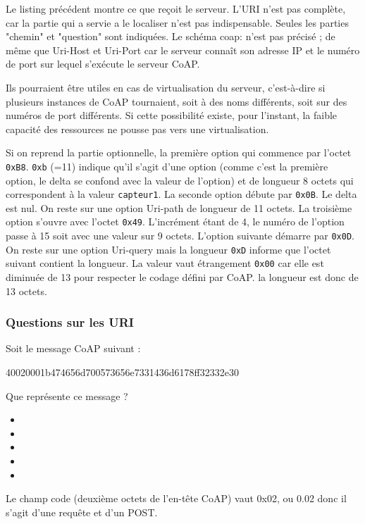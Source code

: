 Le listing précédent montre ce que reçoit le serveur. L'URI n'est pas complète, car la partie qui a servie a le localiser n'est pas indispensable. Seules les parties "chemin" et "question" sont indiquées. Le schéma coap: n’est pas précisé ; de même que Uri-Host et Uri-Port car le serveur connaît son adresse IP et le numéro de port sur lequel s’exécute le serveur CoAP.

Ils pourraient être utiles en cas de virtualisation du serveur, c’est-à-dire si plusieurs instances de CoAP tournaient, soit à des noms différents, soit sur des numéros de port différents. Si cette possibilité existe, pour l’instant, la faible capacité des ressources ne pousse pas vers une virtualisation.

         \vspace{1em}

Si on reprend la partie optionnelle, la première option qui commence par l'octet \texttt{0xB8}. \texttt{0xb} (=11) indique qu'il s'agit d'une option  (comme c'est la première option, le delta se confond avec la valeur de l'option) et de longueur 8 octets qui correspondent à la valeur \texttt{capteur1}. La seconde option débute par \texttt{0x0B}. Le delta est nul. On reste sur une option Uri-path de longueur de 11 octets. La troisième option s'ouvre avec l'octet \texttt{0x49}. L'incrément étant de 4, le numéro de l'option passe à 15 soit  avec une valeur sur 9 octets. L'option suivante démarre par \texttt{0x0D}. On reste sur une option Uri-query mais la longueur \texttt{0xD} informe que l'octet suivant contient la longueur. La valeur vaut étrangement \texttt{0x00} car elle est diminuée de 13 pour respecter le codage défini par CoAP. la longueur est donc de 13 octets.

\subsubsection*{Questions sur les URI}

Soit le message CoAP suivant :

\begin{termc}[backgroundcolor=\color{blue!10}, basicstyle=\ttfamily\small, , escapechar=#]
40020001b474656d700573656e7331436d6178ff32332e30
\end{termc}

{
Que représente ce message ?
\begin{itemize}[label=$\circ$]
   \item {}
   \item {}
   \item {}
   \item {}
   \item {}
 \end{itemize}
}
{ Le champ code (deuxième octets de l'en-tête CoAP) vaut 0x02, ou 0.02 donc il s'agit d'une requête et d'un POST.
}

